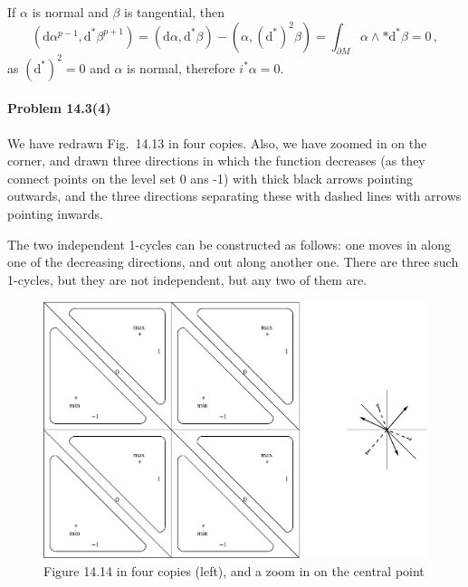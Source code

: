 \documentclass[a4paper,12pt]{article}
\def\d{\mathrm{d}}
\newcommand{\problem}[1]{\paragraph{Problem #1}}
\begin{document}
If $\alpha$ is normal and $\beta$ is tangential, then
\[
 (\d\alpha^{p-1}, \d^*\beta^{p+1}) = (\d\alpha, \d^*\beta) - (\alpha, (\d^*)^2\beta ) = \int_{\partial M} \alpha \wedge * \d^*\beta = 0\,,
\]
as $(\d^*)^2=0$ and $\alpha$ is normal, therefore $i^*\alpha=0$.

\problem{14.3(4)} We have redrawn Fig.\ 14.13 in four copies. Also, we have zoomed in on the corner, and drawn three directions in which the function decreases (as they connect points on the level set 0 ans -1) with thick black arrows pointing outwards, and the three directions separating these with dashed lines with arrows pointing inwards.

The two independent 1-cycles can be constructed as follows: one moves in along one of the decreasing directions, and out along another one. There are three such 1-cycles, but they are not independent, but any two of them are.

\begin{figure}
 \noindent\hfil\includegraphics[scale=.5]{fig/14.13a.eps}
 \caption*{Figure 14.14 in four copies (left), and a zoom in on the central point}
\end{figure}

\end{document}
